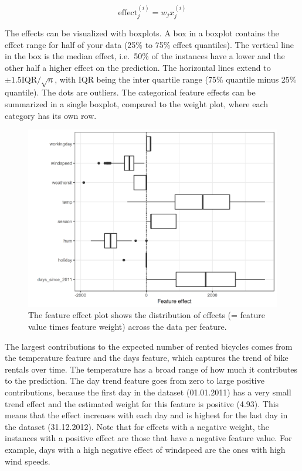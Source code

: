 \documentclass[12pt,]{krantz}
\begin{document}
\[\text{effect}_{j}^{(i)}=w_{j}x_{j}^{(i)}\]

The effects can be visualized with boxplots. A box in a boxplot contains
the effect range for half of your data (25\% to 75\% effect quantiles).
The vertical line in the box is the median effect, i.e.~50\% of the
instances have a lower and the other half a higher effect on the
prediction. The horizontal lines extend to
\(\pm1.5\text{IQR}/\sqrt{n}\), with IQR being the inter quartile range
(75\% quantile minus 25\% quantile). The dots are outliers. The
categorical feature effects can be summarized in a single boxplot,
compared to the weight plot, where each category has its own row.

\begin{figure}

{\centering \includegraphics[width=\textwidth]{images/linear-effects-1} 

}

\caption{The feature effect plot shows the distribution of effects (= feature value times feature weight) across the data per feature.}\label{fig:linear-effects}
\end{figure}

The largest contributions to the expected number of rented bicycles
comes from the temperature feature and the days feature, which captures
the trend of bike rentals over time. The temperature has a broad range
of how much it contributes to the prediction. The day trend feature goes
from zero to large positive contributions, because the first day in the
dataset (01.01.2011) has a very small trend effect and the estimated
weight for this feature is positive (4.93). This means that the effect
increases with each day and is highest for the last day in the dataset
(31.12.2012). Note that for effects with a negative weight, the
instances with a positive effect are those that have a negative feature
value. For example, days with a high negative effect of windspeed are
the ones with high wind speeds.
\end{document}
